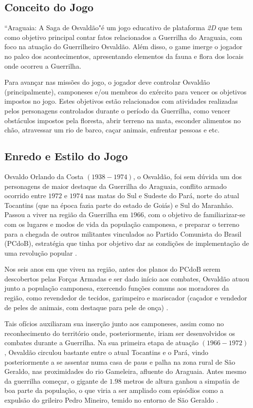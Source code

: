 \subsection{Conceito do Jogo}

``Araguaia: A Saga de Osvaldão"\space é um jogo educativo de plataforma \textit{2D} que tem como objetivo principal contar fatos relacionados a Guerrilha do Araguaia, com foco na atuação do Guerrilheiro Osvaldão. Além disso, o game imerge o jogador no palco dos acontecimentos, apresentando elementos da fauna e flora dos locais onde ocorreu a Guerrilha.

Para avançar nas missões do jogo, o jogador deve controlar Osvaldão (principalmente), camponeses e/ou membros do exército para vencer os objetivos impostos no jogo. Estes objetivos estão relacionados com atividades realizadas pelos personagens controlados durante o período da Guerrilha, como vencer obstáculos impostos pela floresta, abrir terreno na mata, esconder alimentos no chão, atravessar um rio de barco, caçar animais, enfrentar pessoas e etc.

\subsection{Enredo e Estilo do Jogo}

Osvaldo Orlando da Costa $(1938-1974)$, o Osvaldão, foi sem dúvida um dos personagens de maior destaque da Guerrilha do Araguaia, conflito armado ocorrido entre $1972$ e $1974$ nas matas do Sul e Sudeste do Pará, norte do atual Tocantins (que na época fazia parte do estado de Goiás) e Sul do Maranhão. Passou a viver na região da Guerrilha em $1966$, com o objetivo de familiarizar-se com os lugares e modos de vida da população camponesa, e preparar o terreno para a chegada de outros militantes vinculados ao Partido Comunista do Brasil (PCdoB), estratégia que tinha por objetivo dar as condições de implementação de uma revolução popular \cite{bib:jofilly2008}.

Nos seis anos em que viveu na região, antes dos planos do PCdoB serem descobertos pelas Forças Armadas e ser dado início aos combates, Osvaldão atuou junto a população camponesa, exercendo funções comuns aos moradores da região, como revendedor de tecidos, garimpeiro e mariscador (caçador e vendedor de peles de animais, com destaque para pele de onça) \cite{bib:jofilly2008}.

Tais ofícios auxiliaram sua inserção junto aos camponeses, assim como no reconhecimento do território onde, posteriormente, iriam ser desenvolvidos os combates durante a Guerrilha. Na sua primeira etapa de atuação $(1966-1972)$, Osvaldão circulou bastante entre o atual Tocantins e o Pará, vindo posteriormente a se assentar numa casa de paus e palha na zona rural de São Geraldo, nas proximidades do rio Gameleira, afluente do Araguaia. Antes mesmo da guerrilha começar, o gigante de $1.98$ metros de altura ganhou a simpatia de boa parte da população, o que viria a ser ampliado com episódios como a expulsão do grileiro Pedro Mineiro, temido no entorno de São Geraldo \cite{bib:jofilly2008}.

